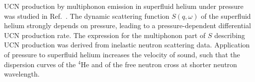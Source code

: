 
UCN production by multiphonon emission in superfluid helium under
pressure was studied in Ref.~\cite{Schmidt2009}.  The dynamic
scattering function $S(q,\omega)$ of the superfluid helium strongly
depends on pressure, leading to a pressure-dependent differential UCN
production rate. The expression for the multiphonon part of $S$
describing UCN production was derived from inelastic neutron
scattering data.  Application of pressure to superfluid helium
increases the velocity of sound, such that the dispersion curves of
the $^4$He and of the free neutron cross at shorter neutron
wavelength.


